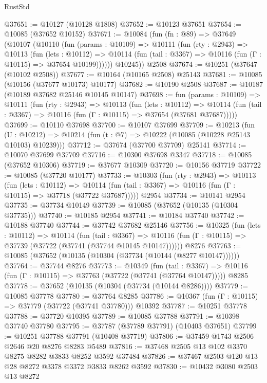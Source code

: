 \begin{lexlean}{RustStd}
\begin{coremodule}
@37651 := @10127 (@10128 @1808)
@37652 := @10123 @37651
@37654 := @10085 (@37652 @10152)
@37671 := @10084
    (fun (fn : @89) =>
    @37649
      (@10107
        (@10110
          (fun (params : @10109) =>
          @10111
            (fun (rty : @2943) =>
            @10113
              (fun (lets : @10112) =>
              @10114 (fun (tail : @3367) => @10116 (fun (Γ : @10115) => @37654 @10199))))))
        @10245))
    @2508
@37674 := @10251 (@37647 (@10102 @2508))
@37677 := @10164 (@10165 @2508) @25143
@37681 := @10085 (@10156 (@37677 @10173) @10177)
@37682 := @10190 @2508
@37687 := @10187 (@10189 @37682 @25146 @10145 @10147)
@37698 := fun (params : @10109) =>
  @10111
    (fun (rty : @2943) =>
    @10113
      (fun (lets : @10112) =>
      @10114 (fun (tail : @3367) => @10116 (fun (Γ : @10115) => @37654 (@37681 @37687)))))
@37699 := @10110 @37698
@37700 := @10107 @37699
@37709 := @10213
    (fun (U : @10212) => @10214 (fun (t : @7) => @10222 (@10085 (@10228 @25143 @10103) @10239)))
@37712 := @37674 (@37700 @37709) @25141
@37714 := @10070 @37699 @37709
@37716 := @10300 @37698 @3347
@37718 := @10085 (@37652 @10306)
@37719 := @37677 @10309
@37720 := @10156 @37719
@37722 := @10085 (@37720 @10177)
@37733 := @10303
    (fun (rty : @2943) =>
    @10113
      (fun (lets : @10112) =>
      @10114 (fun (tail : @3367) => @10116 (fun (Γ : @10115) => @37718 (@37722 @37687)))))
    @2954
@37734 := @10141 @2954
@37735 := @37734 @10149
@37739 := @10085 (@37652 (@10135 (@10304 @37735)))
@37740 := @10185 @2954
@37741 := @10184 @37740
@37742 := @10188 @37740
@37744 := @37742 @37682 @25146
@37756 := @10325
    (fun (lets : @10112) =>
    @10114
      (fun (tail : @3367) =>
      @10116 (fun (Γ : @10115) => @37739 (@37722 (@37741 (@37744 @10145 @10147))))))
    @8276
@37763 := @10085 (@37652 (@10135 (@10304 (@37734 (@10144 (@8277 @10147))))))
@37764 := @37744 @8276
@37773 := @10349
    (fun (tail : @3367) => @10116 (fun (Γ : @10115) => @37763 (@37722 (@37741 (@37764 @10147)))))
    @8285
@37778 := @37652 (@10135 (@10304 (@37734 (@10144 @8286))))
@37779 := @10085 @37778
@37780 := @37764 @8285
@37786 := @10367 (fun (Γ : @10115) => @37779 (@37722 (@37741 @37780))) @10392
@37787 := @10251 @37778
@37788 := @37720 @10395
@37789 := @10085 @37788
@37791 := @10398 @37740 @37780
@37795 := @37787 (@37789 @37791) (@10403 @37651)
@37799 := @10251 @37788 @37791 (@10408 @37719)
@37806 := @37459 @1743 @2506 @2646 @20 @8276 @8283 @5489
@37816 := @37468 @2505 @13 @102 @3370 @8275 @8282 @3833 @8252 @3592 @37484
@37826 := @37467 @2503 @120 @13 @28 @8272 @3378 @3372 @3833 @8262 @3592
@37830 := @10432 @3080 @2503 @13 @8272

\end{coremodule}
\end{lexlean}
